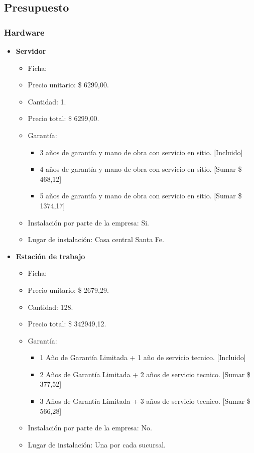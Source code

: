 \subsection{Presupuesto}

\subsubsection{Hardware}
\begin{itemize}
  \item \textbf{Servidor}
    \begin{itemize}
      \item Ficha:
      \item Precio unitario: \$ 6299,00.
      \item Cantidad: 1.
      \item Precio total: \$ 6299,00.
      \item Garantía:
        \begin{itemize}
          \item 3 años de garantía y mano de obra con servicio en sitio. [Incluido]
          \item 4 años de garantía y mano de obra con servicio en sitio. [Sumar \$  468,12]
          \item 5 años de garantía y mano de obra con servicio en sitio. [Sumar \$ 1374,17]
        \end{itemize}
      \item Instalación por parte de la empresa: Si.
      \item Lugar de instalación: Casa central Santa Fe.
    \end{itemize}
  
  \item \textbf{Estación de trabajo}
    \begin{itemize}
      \item Ficha:
      \item Precio unitario: \$ 2679,29.
      \item Cantidad: 128.
      \item Precio total: \$ 342949,12.
      
      \item Garantía:
        \begin{itemize}
          \item 1 Año de Garantía Limitada + 1 año de servicio tecnico. [Incluido]
          \item 2 Años de Garantía Limitada + 2 años de servicio tecnico. [Sumar \$ 377,52]
          \item 3 Años de Garantía Limitada + 3 años de servicio tecnico. [Sumar \$ 566,28]
        \end{itemize}
      \item Instalación por parte de la empresa: No.
      \item Lugar de instalación: Una por cada sucursal.
    \end{itemize}
  

\end{itemize}
